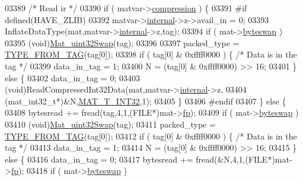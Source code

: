 \begin{DoxyCode}
{{{{{{{{{{{{{{{{{{03389             \textcolor{comment}{/*  Read ir    */}
03390             \textcolor{keywordflow}{if} ( matvar->\hyperlink{group___m_a_t_aeef0466048621cb2c959ba7f6c774d06}{compression} ) \{
03391 \textcolor{preprocessor}{#if defined(HAVE\_ZLIB)}
03392                 matvar->\hyperlink{group___m_a_t_a6e97e3ed9f40c49322c18561c2a94e92}{internal}->z->avail\_in = 0;
03393                 InflateDataType(mat,matvar->\hyperlink{group___m_a_t_a6e97e3ed9f40c49322c18561c2a94e92}{internal}->z,tag);
03394                 \textcolor{keywordflow}{if} ( mat->\hyperlink{struct__mat__t_a99d207977af5e04941ace56d71817a40}{byteswap} )
03395                     (void)\hyperlink{endian_8c_a8cb0d0750e2eaf9840d95db531934f4f}{Mat\_uint32Swap}(tag);
03396 
03397                 packed\_type = \hyperlink{mat5_8c_a82bacecc4afc633b61bc3dc8ef88d1ed}{TYPE\_FROM\_TAG}(tag[0]);
03398                 \textcolor{keywordflow}{if} ( tag[0] & 0xffff0000 ) \{ \textcolor{comment}{/* Data is in the tag */}
03399                     data\_in\_tag = 1;
03400                     N = (tag[0] & 0xffff0000) >> 16;
03401                 \} \textcolor{keywordflow}{else} \{
03402                     data\_in\_tag = 0;
03403                     (void)ReadCompressedInt32Data(mat,matvar->\hyperlink{group___m_a_t_a6e97e3ed9f40c49322c18561c2a94e92}{internal}->z,
03404                              (mat\_int32\_t*)&N,\hyperlink{group___m_a_t_ggacf7b3b879282b7ab3a51190e49bf3453a83e06a68320726c6572bfbb9f3addb1d}{MAT\_T\_INT32},1);
03405                 \}
03406 \textcolor{preprocessor}{#endif}
03407             \} \textcolor{keywordflow}{else} \{
03408                 bytesread += fread(tag,4,1,(FILE*)mat->\hyperlink{struct__mat__t_a85f562e407ca9ad4d2a6e14f839432b7}{fp});
03409                 \textcolor{keywordflow}{if} ( mat->\hyperlink{struct__mat__t_a99d207977af5e04941ace56d71817a40}{byteswap} )
03410                     (void)\hyperlink{endian_8c_a8cb0d0750e2eaf9840d95db531934f4f}{Mat\_uint32Swap}(tag);
03411                 packed\_type = \hyperlink{mat5_8c_a82bacecc4afc633b61bc3dc8ef88d1ed}{TYPE\_FROM\_TAG}(tag[0]);
03412                 \textcolor{keywordflow}{if} ( tag[0] & 0xffff0000 ) \{ \textcolor{comment}{/* Data is in the tag */}
03413                     data\_in\_tag = 1;
03414                     N = (tag[0] & 0xffff0000) >> 16;
03415                 \} \textcolor{keywordflow}{else} \{
03416                     data\_in\_tag = 0;
03417                     bytesread += fread(&N,4,1,(FILE*)mat->\hyperlink{struct__mat__t_a85f562e407ca9ad4d2a6e14f839432b7}{fp});
03418                     \textcolor{keywordflow}{if} ( mat->\hyperlink{struct__mat__t_a99d207977af5e04941ace56d71817a40}{byteswap} )
}}}}}}}}}}}}}}}}}}
\end{DoxyCode}
